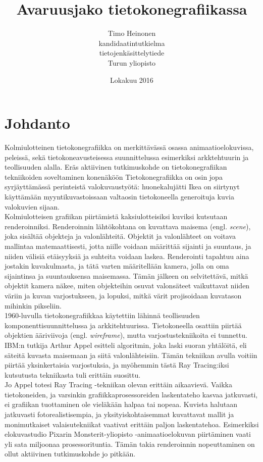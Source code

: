 \documentclass[a4paper,12pt, titlepage]{article}
\title{Avaruusjako tietokonegrafiikassa}
\author{Timo Heinonen \\kandidaatintutkielma \\ tietojenkäsittelytiede \\ Turun yliopisto}
\date{Lokakuu 2016}
\theoremstyle{break}
\begin{document}
\maketitle

\setcounter{tocdepth}{2} %
\tableofcontents

\newpage
\section{Johdanto}

Kolmiulotteinen tietokonegrafiikka on merkittävässä osassa animaatioelokuvissa, peleissä, sekä tietokoneavusteisessa suunnittelussa esimerkiksi arkktehtuurin ja teollisuuden alalla. Eräs aktiivinen tutkimuskohde on tietokonegrafiikan tekniikoiden soveltaminen konenäköön \cite{hughes} Tietokonegrafiikka on osin jopa syrjäyttämässä perinteistä valokuvaustyötä: huonekalujätti Ikea on siirtynyt käyttämään myyntikuvastoissaan valtaosin tietokoneella generoituja kuvia valokuvien sijaan.\cite{ikea}\\

Kolmiulotteisen grafiikan piirtämistä kaksiulotteisiksi kuviksi kutsutaan renderoinniksi. Renderoinnin lähtökohtana on kuvattava maisema (engl. \emph{scene}), joka sisältää objekteja ja valonlähteitä. Objektit ja valonlähteet on voitava mallintaa matemaattisesti, jotta niille voidaan määrittää sijainti ja suuntaus, ja niiden välisiä etäisyyksiä ja suhteita voidaan laskea. Renderointi tapahtuu aina jostakin kuvakulmasta, ja tätä varten määritellään kamera, jolla on oma sijaintinsa ja suuntauksensa maisemassa. Tämän jälkeen on selvitettävä, mitkä objektit kamera näkee, miten objekteihin osuvat valonsäteet vaikuttavat niiden väriin ja kuvan varjostukseen, ja lopuksi, mitkä värit projisoidaan kuvatason mihinkin pikseliin.\cite{janke}\\

1960-luvulla tietokonegrafiikkaa käytettiin lähinnä teollisuuden komponenttisuunnittelussa ja arkkitehtuurissa. Tietokoneella osattiin piirtää objektien ääriviivoja (engl. \emph{wireframe}), mutta varjostustekniikoita ei tunnettu. IBM:n tutkija Arthur Appel esitteli algoritmin, joka laski suoran yhtälöitä, eli säteitä kuvasta maisemaan ja siitä valonlähteisiin. Tämän tekniikan avulla voitiin piirtää yksinkertaisia varjostuksia, ja myöhemmin tästä Ray Tracing:iksi kutsutusta tekniikasta tuli erittäin suosittu.\cite{appel}\\

Jo Appel totesi Ray Tracing -tekniikan olevan erittäin aikaavievä.\cite{appel} Vaikka tietokoneiden, ja varsinkin grafiikkaprosessoreiden laskentateho kasvaa jatkuvasti, ei grafiikan tuottaminen ole vieläkään halpaa tai nopeaa. Kuvista halutaan jatkuvasti fotorealistisempia, ja yksityiskohtaisemmat kuvattavat mallit ja monimutkaiset valaisutekniikat vaativat erittäin paljon laskentatehoa. Esimerkiksi elokuvastudio Pixarin Monsterit-yliopisto -animaatioelokuvan piirtäminen vaati yli sata miljoonaa prosessorituntia.\cite{monsterit} Tämän takia renderoinnin nopeuttaminen on ollut aktiivinen tutkimuskohde jo pitkään.\\
\end{document}
